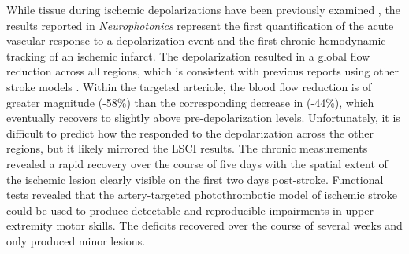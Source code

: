While tissue  during ischemic depolarizations have been previously examined \cite{vonBornstadt:2015dj}, the results reported in \textit{Neurophotonics} \cite{Sullender:2018ff} represent the first quantification of the acute vascular  response to a depolarization event and the first chronic hemodynamic tracking of an ischemic infarct. The depolarization resulted in a global flow reduction across all regions, which is consistent with previous reports using other stroke models \cite{Shin:2006dc,Nakamura:2010wp}. Within the targeted arteriole, the blood flow reduction is of greater magnitude (-58\%) than the corresponding decrease in  (-44\%), which eventually recovers to slightly above pre-depolarization levels. Unfortunately, it is difficult to predict how the  responded to the depolarization across the other regions, but it likely mirrored the LSCI results. The chronic measurements revealed a rapid recovery over the course of five days with the spatial extent of the ischemic lesion clearly visible on the first two days post-stroke. Functional tests revealed that the artery-targeted photothrombotic model of ischemic stroke could be used to produce detectable and reproducible impairments in upper extremity motor skills. The deficits recovered over the course of several weeks and only produced minor lesions.



